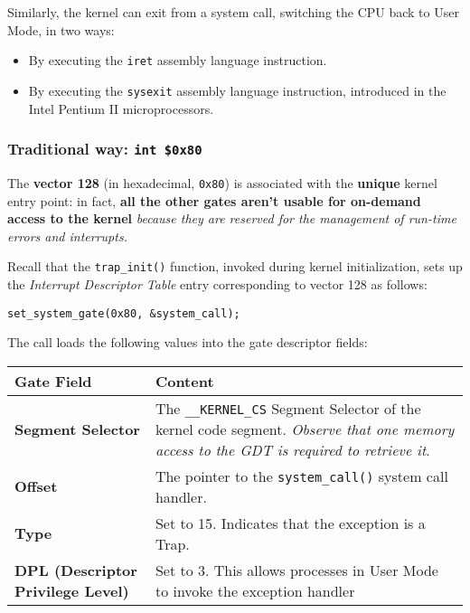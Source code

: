 \documentclass[10pt,a4paper]{article}
\begin{document}
Similarly, the kernel can exit from a system call, switching the CPU back to User Mode, in two ways:
\begin{itemize}

\item By executing the \texttt{iret} assembly language instruction.
\item By executing the \texttt{sysexit} assembly language instruction, introduced in the Intel Pentium II microprocessors.

\end{itemize}

\subsubsection{Traditional way: \texttt{int \$0x80}}

The \textbf{vector 128} (in hexadecimal, \texttt{0x80}) is associated with the \textbf{unique} kernel entry point: in fact, \textbf{all the other gates aren't usable for on-demand access to the kernel} \textit{because they are reserved for the management of run-time errors and interrupts.}

\begin{quoting}
Recall that the \texttt{trap\_init()} function, invoked during kernel initialization, sets up the \textit{Interrupt Descriptor Table} entry corresponding to vector 128 as follows:
\begin{lstlisting}
set_system_gate(0x80, &system_call);
\end{lstlisting}
\end{quoting}

The call loads the following values into the gate descriptor fields:

\begin{center}
\begin{tabular}{l|p{13cm}} 

\toprule
Gate Field & Content \\
\midrule
\textbf{Segment Selector} & The \texttt{\_\_KERNEL\_CS} Segment Selector of the kernel code segment. \textit{Observe that one memory access to the GDT is required to retrieve it}.

\\
\textbf{Offset} & The pointer to the \texttt{system\_call()} system call handler.

\\
\textbf{Type} & Set to 15. Indicates that the exception is a Trap.

\\
\textbf{DPL (Descriptor Privilege Level)} & Set to 3. This allows processes in User Mode to invoke the exception handler

\\
 
\bottomrule
\end{tabular}
\end{center}
\end{document}
